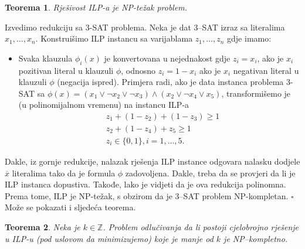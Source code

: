 \documentclass[a4paper, utf8, 11pt, colorlinks]{book}
\newtheorem{thm}{Teorema}
\newenvironment{proof}{{Dokaz:}}{\hfill$\square$}
\begin{document}
   \begin{thm}
   	  Rješivost ILP-a je NP-težak problem.
   \end{thm}
   \begin{proof}
   	   Izvedimo redukciju sa 3-SAT problema. Neka je dat 3--SAT izraz sa literalima  
   	   $x_1,\ldots, x_n$.  Konstruišimo ILP instancu sa varijablama $z_1, \ldots, z_n$ gdje imamo:
   	   \begin{itemize}
   	   	   \item Svaka klauzula $\phi_i(x)$ je konvertovana u nejednakost gdje
   	   	      $z_i = x_i$, ako je $x_i$ pozitivan literal u klauzuli $\phi$, odnosno $z_i = 1 - x_i$ ako je $x_i$ negativan literal u klauzuli $\phi$ (negacija ispred). Primjera radi, ako je data instanca problema 3-SAT sa 
   	   	      $\phi(x) = (x_1 \vee \neg x_2 \vee \neg x_3) \wedge ( x_2 \vee \neg x_4 \vee x_5 )$, transformišemo je (u polinomijalnom vremenu) na instancu ILP-a
   	   	      \begin{align*}
   	   	         	 &z_1 + (1- z_2) + (1 - z_3 ) \geq 1 \\
   	   	         	 &z_2 + (1-z_4)  + z_5 \geq 1 \\
   	   	         	 & z_i \in \{0,1\}, i=1,\ldots,5.
   	   	      \end{align*} 
   	   \end{itemize}
   	   Dakle, iz gornje redukcije, nalazak rješenja ILP instance odgovara nalasku dodjele $\overline{x}$ literalima tako da je formula $\phi$ zadovoljena. Dakle, treba da se provjeri da li je ILP instanca dopustiva. Takođe, lako je vidjeti da je ova redukcija polinomna. Prema tome, ILP je NP-težak, s obzirom da je 3--SAT problem NP-kompletan. 
   \end{proof} \\
 Može se pokazati i sljedeća teorema.
 \begin{thm} Neka je $k\in \mathbb{Z}$.
 	 Problem odlučivanja da li postoji cjelobrojno rješenje u ILP-u (pod uslovom da minimizujemo) koje je manje od $k$ je NP--kompletno. 
 \end{thm}
 
\end{document}
